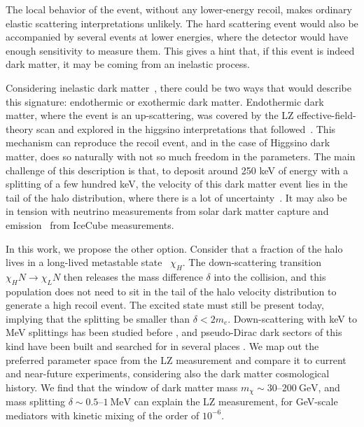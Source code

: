 \documentclass[prd,aps,reprint,superscriptaddress,nofootinbib]{revtex4-2}
\begin{document}
The local behavior of the event, without any lower-energy recoil, makes ordinary elastic scattering interpretations unlikely. The hard scattering event would also be accompanied by several events at lower energies, where the detector would have enough sensitivity to measure them. This gives a hint that, if this event is indeed dark matter, it may be coming from an inelastic process. 

Considering inelastic dark matter~\cite{Tucker-Smith:2001myb}, there could be two ways that would describe this signature: endothermic or exothermic dark matter. Endothermic dark matter, where the event is an up-scattering, was covered by the LZ effective-field-theory scan and explored in the higgsino interpretations that followed~\cite{Yin:2026jnn,DiMauro:2026ldr,Lou:2026idn,Wu:2026nhi,Freese:2026sga,Fan:2026kxx}. This mechanism can reproduce the recoil event, and in the case of Higgsino dark matter, does so naturally with not so much freedom in the parameters. The main challenge of this description is that, to deposit around 250 keV of energy with a splitting of a few hundred keV, the velocity of this dark matter event lies in the tail of the halo distribution, where there is a lot of uncertainty~\cite{Smith-Orlik:2023kyl}. It may also be in tension with neutrino measurements from solar dark matter capture and emission~\cite{Pospelov:2026ewn} from IceCube measurements. 

In this work, we propose the other option. Consider that a fraction of the halo lives in a long-lived metastable state~\cite{Finkbeiner:2007kk} $\chi_H$. The down-scattering transition $\chi_H N \to \chi_L N$ then releases the mass difference $\delta$ into the collision, and this population does not need to sit in the tail of the halo velocity distribution to generate a high recoil event. The excited state must still be present today, implying that the splitting be smaller than $\delta < 2m_e$. Down-scattering with keV to MeV splittings has been studied before \cite{Graham:2010ca,Batell:2009vb,Finkbeiner:2009mi,CarrilloGonzalez:2021lxm}, and pseudo-Dirac dark sectors of this kind have been built and searched for in several places \cite{Cui:2009xq,Izaguirre:2015zva,Finkbeiner:2009mi,Blennow:2016gde,Bhattiprolu:2023akk,Brahma:2023psr}. We map out the preferred parameter space from the LZ measurement and compare it to current and near-future experiments, considering also the dark matter cosmological history. We find that the window of dark matter mass $m_\chi \sim 30$–$200~\mathrm{GeV}$, and mass splitting $\delta \sim 0.5$–$1~\mathrm{MeV}$ can explain the LZ measurement, for GeV-scale mediators with kinetic mixing of the order of $10^{-6}$.
\end{document}
